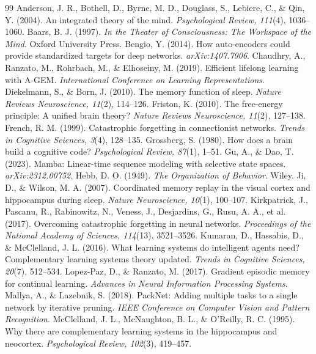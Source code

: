 \documentclass[11pt]{article}
\begin{document}
\begin{thebibliography}{99}
 Anderson, J. R., Bothell, D., Byrne, M. D., Douglass, S., Lebiere, C., \& Qin, Y. (2004). An integrated theory of the mind. \textit{Psychological Review, 111}(4), 1036--1060.
 Baars, B. J. (1997). \textit{In the Theater of Consciousness: The Workspace of the Mind}. Oxford University Press.
 Bengio, Y. (2014). How auto-encoders could provide standardized targets for deep networks. \textit{arXiv:1407.7906}.
 Chaudhry, A., Ranzato, M., Rohrbach, M., \& Elhoseiny, M. (2019). Efficient lifelong learning with A-GEM. \textit{International Conference on Learning Representations}.
 Diekelmann, S., \& Born, J. (2010). The memory function of sleep. \textit{Nature Reviews Neuroscience, 11}(2), 114--126.
 Friston, K. (2010). The free-energy principle: A unified brain theory? \textit{Nature Reviews Neuroscience, 11}(2), 127--138.
 French, R. M. (1999). Catastrophic forgetting in connectionist networks. \textit{Trends in Cognitive Sciences, 3}(4), 128--135.
 Grossberg, S. (1980). How does a brain build a cognitive code? \textit{Psychological Review, 87}(1), 1--51.
 Gu, A., \& Dao, T. (2023). Mamba: Linear-time sequence modeling with selective state spaces. \textit{arXiv:2312.00752}.
 Hebb, D. O. (1949). \textit{The Organization of Behavior}. Wiley.
 Ji, D., \& Wilson, M. A. (2007). Coordinated memory replay in the visual cortex and hippocampus during sleep. \textit{Nature Neuroscience, 10}(1), 100--107.
 Kirkpatrick, J., Pascanu, R., Rabinowitz, N., Veness, J., Desjardins, G., Rusu, A. A., et al. (2017). Overcoming catastrophic forgetting in neural networks. \textit{Proceedings of the National Academy of Sciences, 114}(13), 3521--3526.
 Kumaran, D., Hassabis, D., \& McClelland, J. L. (2016). What learning systems do intelligent agents need? Complementary learning systems theory updated. \textit{Trends in Cognitive Sciences, 20}(7), 512--534.
 Lopez-Paz, D., \& Ranzato, M. (2017). Gradient episodic memory for continual learning. \textit{Advances in Neural Information Processing Systems}.
 Mallya, A., \& Lazebnik, S. (2018). PackNet: Adding multiple tasks to a single network by iterative pruning. \textit{IEEE Conference on Computer Vision and Pattern Recognition}.
 McClelland, J. L., McNaughton, B. L., \& O'Reilly, R. C. (1995). Why there are complementary learning systems in the hippocampus and neocortex. \textit{Psychological Review, 102}(3), 419--457.

\end{thebibliography}
\end{document}
